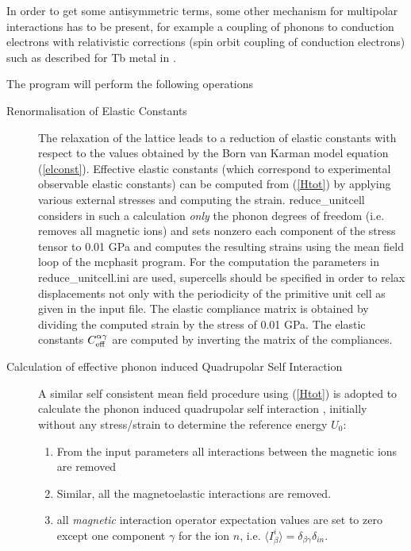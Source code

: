 \begin{description}
\begin{description}
{       }
       In order to get some antisymmetric terms, some other mechanism for multipolar interactions
       has to be present, for example a coupling of phonons to conduction electrons with
       relativistic corrections (spin orbit coupling of conduction electrons) such as described
       for Tb metal in \cite{liu72-793}.
        
                        The program will perform the following operations
\begin{description}
 \item[Renormalisation of Elastic Constants] The relaxation of the lattice
       leads to a reduction of elastic constants with respect to the values obtained by 
 the Born van Karman model equation (\ref{elconst}). Effective elastic constants (which
 correspond to experimental observable elastic constants) can be computed from (\ref{Htot}) by applying
 various external stresses and computing the strain. {\prg reduce\_unitcell} considers
 in such a calculation {\em only} the phonon degrees of freedom (i.e. removes all magnetic ions) and
 sets nonzero each component of the stress tensor to 0.01 GPa and computes the resulting
 strains using the mean field loop of the {\prg mcphasit} program. For the computation the parameters 
 in {\prg reduce\_unitcell.ini} are used, supercells should be specified
 in order to relax displacements not only with the periodicity of the primitive
 unit cell as given in the input file.
 The elastic compliance matrix \cite{barron80-609} is obtained by 
 dividing the computed strain by the stress of 0.01 GPa. 
 The elastic constants $C_{\rm eff}^{\alpha\gamma}$ 
 are computed by inverting the matrix of the compliances.
 \item[Calculation of effective phonon induced  Quadrupolar Self Interaction]
 A similar self consistent mean field procedure using (\ref{Htot}) is adopted to calculate the phonon induced
 quadrupolar self interaction , initially without any stress/strain to determine the reference energy
 $U_0$:
  \begin{enumerate}
   \item From the input parameters all interactions between the magnetic ions are removed
   \item Similar, all the magnetoelastic interactions are removed.
   \item all {\em magnetic} interaction operator expectation values are set to zero 
         except one component $\gamma$ for the ion $n$, i.e.
          $\langle I^i_{\beta}\rangle=\delta_{\beta\gamma}\delta_{in}$.

\end{enumerate}
\end{description}
\end{description}
\end{description}
